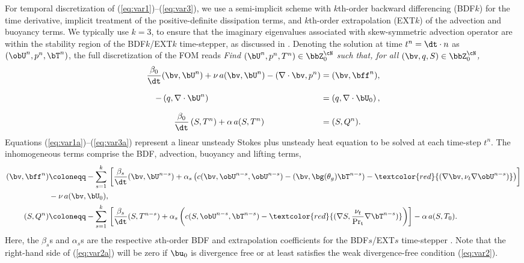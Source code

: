 For temporal discretization of (\ref{eq:var1})--(\ref{eq:var3}), we use a
semi-implicit scheme with $k$th-order backward differencing (BDF$k$) for the
time derivative, implicit treatment of the positive-definite dissipation terms,
and $k$th-order extrapolation (EXT$k$) of the advection and buoyancy terms.  We
typically use $k=3$, to ensure that the imaginary eigenvalues associated with
skew-symmetric advection operator are within the stability region of the
BDF$k$/EXT$k$ time-stepper, as discussed in \cite{fischer2017recent}.  Denoting
the solution at time $t^n = \dt \cdot n$ as $(\obU^n,p^n,\bT^n)$, the full
discretization of the FOM reads {\em Find $(\bU^n,p^n,T^n) \in \bbZ^{\cN}_0$
such that, for all $(\bv,q,S) \in \bbZ^{\cN}_0$,}
%
\begin{align} \label{eq:var1a}
   \frac{\beta_0}{\dt} ( \bv,\bU^n ) + \nu \, a(\bv,\bU^n) - \left(\nabla \cdot
   \bv , p^n \right) &= (\bv,\bff^n), \\[1.6ex] \label{eq:var2a} 
   - \left(q, \nabla \cdot \bU^n  \right) \hspace{1.85in} &=
   \left(q, \nabla \cdot \bU_0 \right), \\[1.6ex] \label{eq:var3a}
   \frac{\beta_0}{\dt} \left( S,T^n \right) + \alpha \, a(S,T^n)
   \hspace{0.93in} &=  (S,Q^n).
\end{align}
%
Equations (\ref{eq:var1a})--(\ref{eq:var3a}) represent a linear unsteady
Stokes plus unsteady heat equation to be solved at each time-step $t^n$.  The
inhomogeneous terms comprise the BDF, advection, buoyancy and lifting terms,
%
\begin{align} \label{eq:rhs1a}
   (\bv, \bff^n) &\coloneqq -\sum_{s=1}^k \, \left[ \frac{\beta_s}{\dt} (
\bv,\bU^{n-s} ) + \alpha_s \left( c( \bv , \obU^{n-s} , \obU^{n-s} ) - ( \bv,
\bg(\theta_g) \bT^{n-s}) - \textcolor{red}{( \nabla \bv , \nu_t \nabla
\obU^{n-s})} \right) \right] \nonumber \\ & - \nu \, a(\bv, \bU_0), \\
   \label{eq:rhs2a} 
   \left(S, Q^n \right) &\coloneqq -\sum_{s=1}^k \, \left[ \frac{\beta_s}{\dt}
(S, T^{n-s}) + \alpha_s \left( c(S, \obU^{n-s}, \bT^{n-s}) -
\textcolor{red}{(\nabla S, \frac{\nu_t}{\rm Pr_t} \nabla \bT^{n-s})} \right)
\right] - \alpha \, a(S,T_0).
\end{align}
%
Here, the $\beta_s$s and $\alpha_s$s are the respective $s$th-order BDF and
extrapolation coefficients for the BDF$s$/EXT$s$ time-stepper
\cite{fischer2017recent}.  Note that the right-hand side of (\ref{eq:var2a})
will be zero if $\bu_0$ is divergence free or at least satisfies the weak
divergence-free condition (\ref{eq:var2}).

